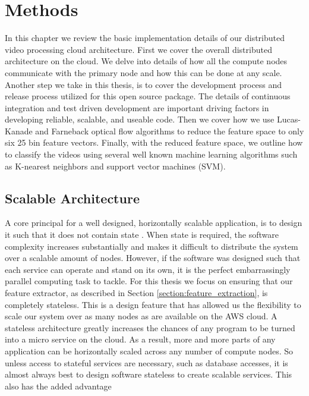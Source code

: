\chapter{Methods}
In this chapter we review the basic implementation details of our distributed
video processing cloud architecture. First we cover the overall distributed
architecture on the cloud.  We delve into details of how all the compute nodes
communicate with the primary node and how this can be done at any scale. Another
step we take in this thesis,  is to cover the development process and release
process utilized for this open source package. The details of continuous
integration and test driven development are  important driving factors in
developing reliable, scalable, and useable code.  Then we cover how we use
Lucas-Kanade and Farneback optical flow algorithms to reduce the feature space
to only six 25 bin feature vectors. Finally, with the reduced feature space, we
outline how to classify the videos using several well known machine learning
algorithms such as K-nearest neighbors and support vector machines (SVM).

\section{\label{section:distributed_processing}Scalable Architecture}
A core principal for a well designed, horizontally scalable application, is
to design it such that it does not contain state \cite{awsbestpractices}.
When state is required, the software complexity increases substantially and
makes it difficult to distribute the system over a scalable amount of nodes.
However, if the software was designed such that each service can operate and
stand on its own, it is the perfect embarrassingly parallel computing task to
tackle. For this thesis we focus on ensuring that our feature extractor,
as described in Section \ref{section:feature_extraction}, is completely stateless.
This is a design feature that has allowed us the flexibility to scale our
system over as many nodes as are available on the AWS cloud. A stateless architecture
greatly increases the chances of any program to be turned into a micro service
on the cloud. As a result, more and more parts of any application can  be horizontally scaled
across any number of compute nodes. So unless access to stateful services are
necessary, such as database accesses, it is almost always best to design
software stateless to create scalable services. This also has the added advantage


